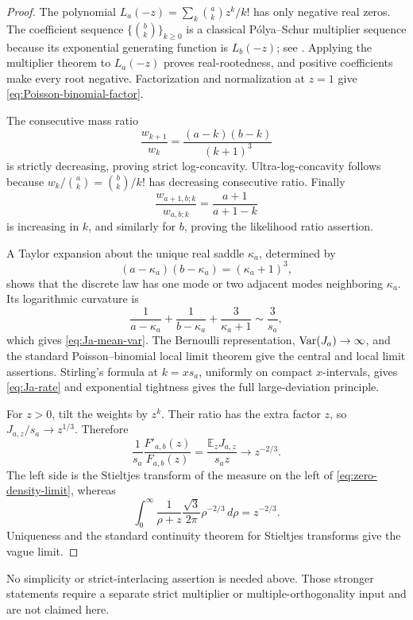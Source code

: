 \begin{proof}
The polynomial \(L_a(-z)=\sum_k\binom akz^k/k!\) has only negative real
zeros.  The coefficient sequence \(\{\binom bk\}_{k\ge0}\) is a classical
P\'olya--Schur multiplier sequence because its exponential generating
function is \(L_b(-z)\); see \cite{PolyaSchur1914}.  Applying the multiplier
theorem to \(L_a(-z)\)
proves real-rootedness, and positive coefficients make every root negative.
Factorization and normalization at \(z=1\) give
\eqref{eq:Poisson-binomial-factor}.

The consecutive mass ratio
\[
 \frac{w_{k+1}}{w_k}=\frac{(a-k)(b-k)}{(k+1)^3}
\]
is strictly decreasing, proving strict log-concavity.  Ultra-log-concavity
follows because \(w_k/\binom ak=\binom bk/k!\) has decreasing consecutive
ratio.  Finally
\[
 \frac{w_{a+1,b;k}}{w_{a,b;k}}=\frac{a+1}{a+1-k}
\]
is increasing in \(k\), and similarly for \(b\), proving the likelihood
ratio assertion.

A Taylor expansion about the unique real saddle
\(\kappa_a\), determined by
\[
 (a-\kappa_a)(b-\kappa_a)=(\kappa_a+1)^3,
\]
shows that the discrete law has one mode or two adjacent modes neighboring
\(\kappa_a\).  Its logarithmic curvature is
\[
 \frac1{a-\kappa_a}+\frac1{b-\kappa_a}
 +\frac3{\kappa_a+1}\sim\frac3{s_a},
\]
which gives \eqref{eq:Ja-mean-var}.  The Bernoulli representation,
\(\operatorname{Var}(J_a)\to\infty\), and the standard Poisson--binomial local limit
theorem \cite[Chapter~VII]{Petrov1975} give the central and local limit
assertions.  Stirling's
formula at \(k=xs_a\), uniformly on compact \(x\)-intervals, gives
\eqref{eq:Ja-rate} and exponential tightness gives the full large-deviation
principle.

For \(z>0\), tilt the weights by \(z^k\).  Their ratio has the extra factor
\(z\), so \(J_{a,z}/s_a\to z^{1/3}\).  Therefore
\begin{equation}\label{eq:Stieltjes-transform-limit}
 \frac1{s_a}\frac{F'_{a,b}(z)}{F_{a,b}(z)}
 =\frac{\mathbb E_zJ_{a,z}}{s_az}\longrightarrow z^{-2/3}.
\end{equation}
The left side is the Stieltjes transform of the measure on the left of
\eqref{eq:zero-density-limit}, whereas
\[
 \int_0^\infty\frac1{\rho+z}
 \frac{\sqrt3}{2\pi}\rho^{-2/3}\,d\rho=z^{-2/3}.
\]
Uniqueness and the standard continuity theorem for Stieltjes transforms
\cite[Chapter~I]{Akhiezer1965} give the vague limit.
\end{proof}

No simplicity or strict-interlacing assertion is needed above.  Those
stronger statements require a separate strict multiplier or
multiple-orthogonality input and are not claimed here.


